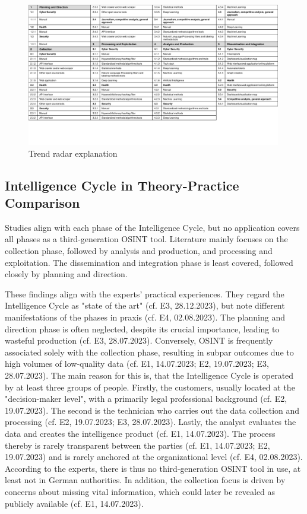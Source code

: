\documentclass[10pt]{article}
\begin{document}
\begin{figure}[thb]
    \centering
    \includegraphics[width=0.99\textwidth]{PDF/images/crop_Trendradar explanation}
    \caption{Trend radar explanation}
    \label{fig:trendradarexplanation}
\end{figure}

\subsection{Intelligence Cycle in Theory-Practice Comparison}

Studies align with each phase of the Intelligence Cycle, but no application covers all phases as a third-generation OSINT tool. Literature mainly focuses on the collection phase, followed by analysis and production, and processing and exploitation. The dissemination and integration phase is least covered, followed closely by planning and direction.

These findings align with the experts' practical experiences. They regard the Intelligence Cycle as "state of the art" (cf. E3, 28.12.2023), but note different manifestations of the phases in praxis (cf. E4, 02.08.2023).
The planning and direction phase is often neglected, despite its crucial importance, leading to wasteful production (cf. E3, 28.07.2023). Conversely, OSINT is frequently associated solely with the collection phase,
resulting in subpar outcomes due to high volumes of low-quality data (cf. E1, 14.07.2023; E2, 19.07.2023; E3, 28.07.2023). The main reason for this is, that the Intelligence Cycle is operated by at least three groups of people. Firstly, the customers, usually located at the "decision-maker level", with a primarily legal professional background (cf. E2, 19.07.2023).
The second is the technician who carries out the data collection and processing (cf. E2, 19.07.2023; E3, 28.07.2023). Lastly, the analyst evaluates the data and creates the intelligence product (cf. E1, 14.07.2023). The process thereby is rarely transparent between the parties
(cf. E1, 14.07.2023; E2, 19.07.2023) and is rarely anchored at the organizational level (cf. E4, 02.08.2023). According to the experts, there is thus no third-generation
OSINT tool in use, at least not in German authorities. In addition, the collection focus is driven by concerns about missing vital information, which could later be revealed as publicly available (cf. E1, 14.07.2023).
\end{document}
